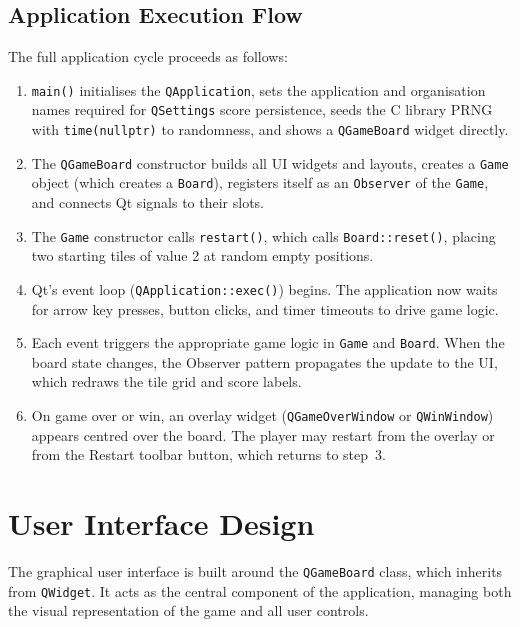 \documentclass[a4paper,12pt]{article}
\begin{document}
\subsection{Application Execution Flow}

The full application cycle proceeds as follows:

\begin{enumerate}
    \item \texttt{main()} initialises the \texttt{QApplication}, sets the application and organisation names required for \texttt{QSettings} score persistence, seeds the C library PRNG with \texttt{time(nullptr)} to randomness, and shows a \texttt{QGameBoard} widget directly.
    \item The \texttt{QGameBoard} constructor builds all UI widgets and layouts, creates a \texttt{Game} object (which creates a \texttt{Board}), registers itself as an \texttt{Observer} of the \texttt{Game}, and connects Qt signals to their slots.
    \item The \texttt{Game} constructor calls \texttt{restart()}, which calls \texttt{Board::reset()}, placing two starting tiles of value 2 at random empty positions.
    \item Qt's event loop (\texttt{QApplication::exec()}) begins. The application now waits for arrow key presses, button clicks, and timer timeouts to drive game logic.
    \item Each event triggers the appropriate game logic in \texttt{Game} and \texttt{Board}. When the board state changes, the Observer pattern propagates the update to the UI, which redraws the tile grid and score labels.
    \item On game over or win, an overlay widget (\texttt{QGameOverWindow} or \texttt{QWinWindow}) appears centred over the board. The player may restart from the overlay or from the Restart toolbar button, which returns to step~3.
\end{enumerate}

\section{User Interface Design}

The graphical user interface is built around the \texttt{QGameBoard} class, which inherits from \texttt{QWidget}. It acts as the central component of the application, managing both the visual representation of the game and all user controls.
\end{document}
